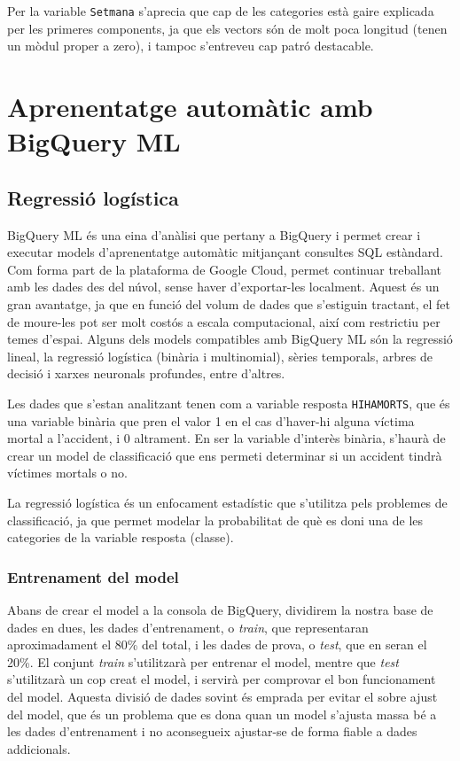 \documentclass[12pt,longbibliography]{article}
\theoremstyle{definition}
\theoremstyle{remark}
\begin{document}
Per la variable \texttt{Setmana} s'aprecia que cap de les categories està gaire explicada per les primeres components, ja que els vectors són de molt poca longitud (tenen un mòdul proper a zero), i tampoc s'entreveu cap patró destacable.

\section{Aprenentatge automàtic amb BigQuery ML}

\subsection{Regressió logística}

BigQuery ML és una eina d'anàlisi que pertany a BigQuery i permet crear i executar models d'aprenentatge automàtic mitjançant consultes SQL estàndard. Com forma part de la plataforma de Google Cloud, permet continuar treballant amb les dades des del núvol, sense haver d'exportar-les localment. Aquest és un gran avantatge, ja que en funció del volum de dades que s'estiguin tractant, el fet de moure-les pot ser molt costós a escala computacional, així com restrictiu per temes d'espai. Alguns dels models compatibles amb BigQuery ML són la regressió lineal, la regressió logística (binària i multinomial), sèries temporals, arbres de decisió i xarxes neuronals profundes, entre d'altres.


Les dades que s'estan analitzant tenen com a variable resposta \texttt{HIHAMORTS}, que és una variable binària que pren el valor 1 en el cas d'haver-hi alguna víctima mortal a l'accident, i 0 altrament. En ser la variable d'interès binària, s'haurà de crear un model de classificació que ens permeti determinar si un accident tindrà víctimes mortals o no. 


La regressió logística és un enfocament estadístic que s'utilitza pels problemes de classificació, ja que permet modelar la probabilitat de què es doni una de les categories de la variable resposta (classe).


\subsubsection{Entrenament del model}

Abans de crear el model a la consola de BigQuery, dividirem la nostra base de dades en dues, les dades d'entrenament, o \emph{train}, que representaran aproximadament el 80\% del total, i les dades de prova, o \emph{test}, que en seran el 20\%. El conjunt \emph{train} s'utilitzarà per entrenar el model, mentre que \emph{test} s'utilitzarà un cop creat el model, i servirà per comprovar el bon funcionament del model. Aquesta divisió de dades sovint és emprada per evitar el sobre ajust del model, que és un problema que es dona quan un model s'ajusta massa bé a les dades d'entrenament i no aconsegueix ajustar-se de forma fiable a dades addicionals.
\end{document}
